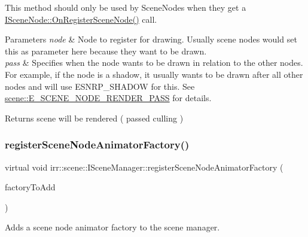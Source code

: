 This method should only be used by Scene\+Nodes when they get a \hyperlink{classirr_1_1scene_1_1ISceneNode_ac9795bfcb88dcaf8cba6ea3296e5d8d0}{I\+Scene\+Node\+::\+On\+Register\+Scene\+Node()} call. 
\begin{DoxyParams}{Parameters}
{\em node} & Node to register for drawing. Usually scene nodes would set \textquotesingle{}this\textquotesingle{} as parameter here because they want to be drawn. \\
\hline
{\em pass} & Specifies when the node wants to be drawn in relation to the other nodes. For example, if the node is a shadow, it usually wants to be drawn after all other nodes and will use E\+S\+N\+R\+P\+\_\+\+S\+H\+A\+D\+OW for this. See \hyperlink{namespaceirr_1_1scene_a7862269bd1abc123929d4dbb8200d67f}{scene\+::\+E\+\_\+\+S\+C\+E\+N\+E\+\_\+\+N\+O\+D\+E\+\_\+\+R\+E\+N\+D\+E\+R\+\_\+\+P\+A\+SS} for details. \\
\hline
\end{DoxyParams}
\begin{DoxyReturn}{Returns}
scene will be rendered ( passed culling ) 
\end{DoxyReturn}
\mbox{\label{classirr_1_1scene_1_1ISceneManager_af48c93cc41f986f08ed964cc575ee7a0}} 
\subsubsection{\texorpdfstring{register\+Scene\+Node\+Animator\+Factory()}{registerSceneNodeAnimatorFactory()}}
{\footnotesize\ttfamily virtual void irr\+::scene\+::\+I\+Scene\+Manager\+::register\+Scene\+Node\+Animator\+Factory (\begin{DoxyParamCaption}\item[{\hyperlink{classirr_1_1scene_1_1ISceneNodeAnimatorFactory}{I\+Scene\+Node\+Animator\+Factory} $\ast$}]{factory\+To\+Add }\end{DoxyParamCaption})\hspace{0.3cm}{\ttfamily [pure virtual]}}



Adds a scene node animator factory to the scene manager. 

